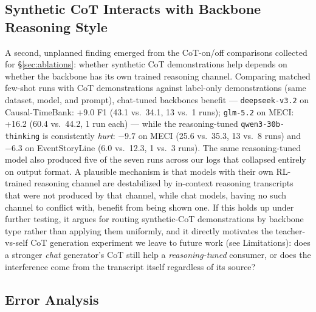 \documentclass[11pt]{article}
\begin{document}
\subsection{Synthetic CoT Interacts with Backbone Reasoning Style}
\label{sec:cotbackbone}

A second, unplanned finding emerged from the CoT-on/off comparisons collected for
\S\ref{sec:ablations}: whether synthetic CoT demonstrations help depends on
whether the backbone has its own trained reasoning channel. Comparing matched
few-shot runs with CoT demonstrations against label-only demonstrations (same
dataset, model, and prompt), chat-tuned backbones benefit --- \texttt{deepseek-v3.2}
on Causal-TimeBank: +9.0 F1 (43.1 vs.\ 34.1, 13 vs.\ 1 runs); \texttt{glm-5.2} on
MECI: +16.2 (60.4 vs.\ 44.2, 1 run each) --- while the reasoning-tuned
\texttt{qwen3-30b-thinking} is consistently \emph{hurt}: $-9.7$ on MECI (25.6 vs.\
35.3, 13 vs.\ 8 runs) and $-6.3$ on EventStoryLine (6.0 vs.\ 12.3, 1 vs.\ 3 runs).
The same reasoning-tuned model also produced five of the seven runs across our
logs that collapsed entirely on output format. A plausible mechanism is that
models with their own RL-trained reasoning channel are destabilized by in-context
reasoning transcripts that were not produced by that channel, while chat models,
having no such channel to conflict with, benefit from being shown one. If this
holds up under further testing, it argues for routing synthetic-CoT demonstrations
by backbone type rather than applying them uniformly, and it directly motivates
the teacher-vs-self CoT generation experiment we leave to future work (see
Limitations): does a stronger \emph{chat} generator's CoT still help a
\emph{reasoning-tuned} consumer, or does the interference come from the transcript
itself regardless of its source?

\subsection{Error Analysis}
\label{sec:erroranalysis}
\end{document}
